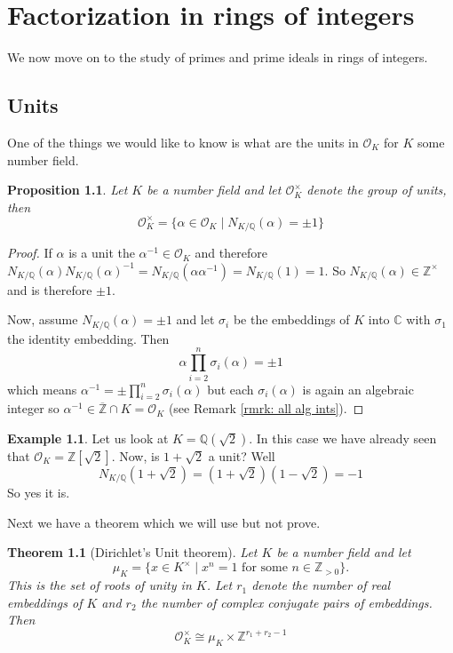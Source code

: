 \documentclass[11pt,a4paper]{report}
\theoremstyle{plain}
\newtheorem{thm}[subsection]{Theorem}
\newtheorem{prop}[subsection]{Proposition}
\theoremstyle{definition}
\newtheorem{exmp}[subsection]{Example}
\theoremstyle{definition}
\newcommand{\ZZ}{\mathbb{Z}}
\def\CC{\mathbb{C}}
\def\QQ{\mathbb{Q}}
\def \a{\alpha}
\def \OO {\mathcal{O}}
\def \ov{\overline}
\begin{document}
	\chapter{Factorization in rings of integers}
	
	We now move on to the study of primes and prime ideals in rings of integers.
	
	\section{Units}
	
	
	
	One of the things we would like to know is what are the units in $\OO_K$ for $K$ some number field. 
	
	\begin{prop}
		Let $K$ be a number field and let $\OO_K^\times$ denote the group of units, then \[\OO_K^\times=\{\a \in \OO_K \mid N_{K/\QQ}(\a)=\pm 1\} \]
	\end{prop}
	
	\begin{proof}
		If $\a$ is a unit the $\a^{-1} \in \OO_K$ and therefore $N_{K/\QQ}(\a)N_{K/\QQ}(\a)^{-1}=N_{K/\QQ}(\a \a^{-1})=N_{K/\QQ}(1)=1$. So $N_{K/\QQ}(\a) \in \ZZ^\times$ and is therefore $\pm 1$.
		
		Now, assume $N_{K/\QQ}(\a)=\pm 1$ and let $\sigma_i$ be the embeddings of $K$ into $\CC$ with $\sigma_1$ the identity embedding. Then \[\a \prod_{i=2}^n \sigma_i(\a)=\pm 1 \] which means $\a^{-1}=\pm \prod_{i=2}^n \sigma_i(\a)$ but each $\sigma_i(\a)$ is again an algebraic integer so $ \a^{-1} \in \ov{\ZZ} \cap K=\OO_K$ (see Remark \ref{rmrk: all alg ints}).
		
	\end{proof}
	
	
	
	\begin{exmp}
		Let us look at $K=\QQ(\sqrt{2})$. In this case we have already seen that $\OO_K=\ZZ[\sqrt{2}]$. Now, is $1+\sqrt{2}$ a unit? Well \[N_{K/\QQ}(1+\sqrt{2})=(1+\sqrt{2})(1-\sqrt{2})=-1\] So yes it is.
	\end{exmp}
	
	Next we have a theorem which we will use but not prove.
	\begin{thm}[Dirichlet's Unit theorem]\label{thm: dir unit thm}
		Let $K$ be a number field and let \[\mu_K=\{x \in K^\times \mid x^n=1 \text{ for some } n  \in \ZZ_{> 0}\}.\] This is the set of roots of unity in $K$. Let $r_1$ denote the number of real embeddings of $K$ and $r_2$ the number of complex conjugate pairs of embeddings. Then \[\OO_K^{\times} \cong \mu_K \times \ZZ^{r_1+r_2-1}\]
	\end{thm}
	
\end{document}
